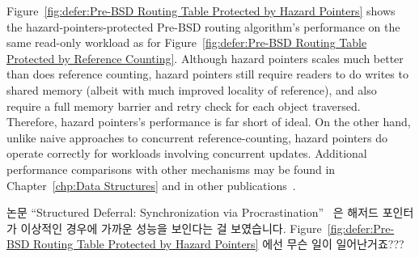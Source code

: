 Figure~\ref{fig:defer:Pre-BSD Routing Table Protected by Hazard Pointers}
shows the hazard-pointers-protected Pre-BSD routing algorithm's
performance on the same read-only workload as for
Figure~\ref{fig:defer:Pre-BSD Routing Table Protected by Reference Counting}.
Although hazard pointers scales much better than does reference counting,
hazard pointers still require readers to do writes to shared
memory (albeit with much improved locality of reference),
and also require a full memory barrier and retry check for each
object traversed.
Therefore, hazard pointers's performance is far short of ideal.
On the other hand, unlike naive approaches to concurrent reference-counting,
hazard pointers do operate correctly for workloads
involving concurrent updates.
Additional performance comparisons with other mechanisms may be found in
Chapter~\ref{chp:Data Structures}
and in other publications~\cite{ThomasEHart2007a,McKenney:2013:SDS:2483852.2483867,MagedMichael04a}.
\fi

\QuickQuiz{}
	논문 ``Structured Deferral: Synchronization via
	Procrastination''~\cite{McKenney:2013:SDS:2483852.2483867} 은 해저드
	포인터가 이상적인 경우에 가까운 성능을 보인다는 걸 보였습니다.
	Figure~\ref{fig:defer:Pre-BSD Routing Table Protected by Hazard Pointers}
	에선 무슨 일이 일어난거죠???
	\iffalse

